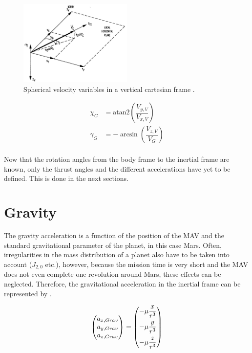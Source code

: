  \begin{figure}[H]
\centering
\includegraphics[width=0.5\textwidth]{figures/reference_frames/vertical_spherical_mooij1994motion.jpg}
\caption{Spherical velocity variables in a vertical cartesian frame \citep{mooij1994motion}.}
\label{fig:vertical_spherical_mooij1994motion}
\end{figure}




\begin{equation} \label{eq:fpaAndazimuth}
\begin{split}
\chi_{G}&=\text{atan2}\left(\dfrac{V_{y,V}}{V_{x,V}}\right)\\
\gamma_{G}&=-\arcsin\left(\dfrac{V_{z,V}}{V_{G}}\right)\\
\end{split}
\end{equation}



\noindent
Now that the rotation angles from the body frame to the inertial frame are known, only the thrust angles and the different accelerations have yet to be defined. This is done in the next sections.


\section{Gravity}
\label{sec:gravityModel}
The gravity acceleration is a function of the position of the \ac{MAV} and the standard gravitational parameter of the planet, in this case Mars. Often, irregularities in the mass distribution of a planet also have to be taken into account ($J_{2,0}$ etc.), however, because the mission time is very short and the \ac{MAV} does not even complete one revolution around Mars, these effects can be neglected. Therefore, the gravitational acceleration in the inertial frame can be represented by .

\begin{equation} \label{eq:gravityModel}
\begin{pmatrix}
a_{x,Grav}\\
a_{y,Grav}\\
a_{z,Grav}\\
\end{pmatrix}
=
\begin{pmatrix}
-\mu\dfrac{x}{r^{3}} \vspace{5pt} \\ \vspace{5pt} 
-\mu\dfrac{y}{r^{3}}\\
-\mu\dfrac{z}{r^{3}}\\
\end{pmatrix}
\end{equation}

